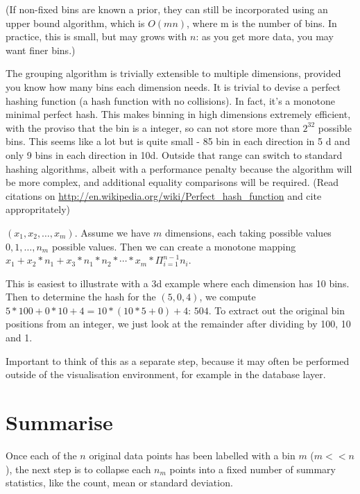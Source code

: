 \documentclass[journal]{vgtc}                %
\begin{document}
(If non-fixed bins are known a prior, they can still be incorporated using an upper bound algorithm, which is $O(mn)$, where m is the number of bins. In practice, this is small, but may grows with $n$: as you get more data, you may want finer bins.)


The grouping algorithm is trivially extensible to multiple dimensions, provided you know how many bins each dimension needs. It is trivial to devise a perfect hashing function (a hash function with no collisions). In fact, it's a monotone minimal perfect hash. This makes binning in high dimensions extremely efficient, with the proviso that the bin is a integer, so can not store more than $2^32$ possible bins.  This seems like a lot but is quite small - 85 bin in each direction in 5 d and only 9 bins in each direction in 10d.  Outside that range can switch to standard hashing algorithms, albeit with a performance penalty because the algorithm will be more complex, and additional equality comparisons will be required. (Read citations on \url{http://en.wikipedia.org/wiki/Perfect_hash_function} and cite appropritately)

$(x_1, x_2, \ldots, x_m)$. Assume we have $m$ dimensions, each taking possible values $0, 1, \ldots, n_m$ possible values.  Then we can create a monotone mapping $x_1 + x_2 * n_1 + x_3 * n_1 * n_2 * \cdots * x_m * \Pi^{n-1}_{i = 1} n_i$.

This is easiest to illustrate with a 3d example where each dimension has 10 bins.  Then to determine the hash for the $(5, 0, 4)$, we compute $5 * 100 + 0 * 10 + 4 = 10 * (10 * 5 + 0) + 4$: $504$. To extract out the original bin positions from an integer, we just look at the remainder after dividing by 100, 10 and 1.


Important to think of this as a separate step, because it may often be performed outside of the visualisation environment, for example in the database layer. 

\section{Summarise}
\label{sec:summarise}

Once each of the $n$ original data points has been labelled with a bin $m$ ($m << n$), the next step is to collapse each $n_m$ points into a fixed number of summary statistics, like the count, mean or standard deviation.
\end{document}
